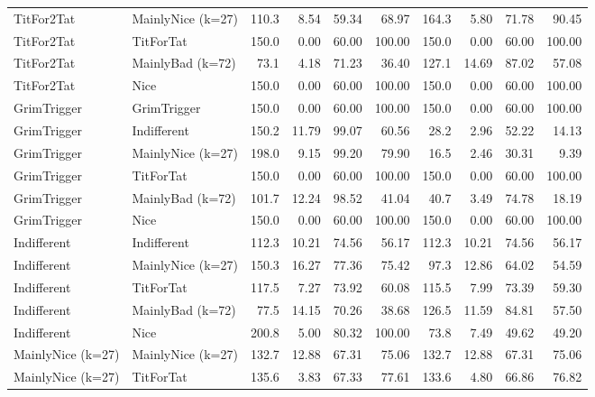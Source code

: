 \documentclass[journal,a4paper,10pt,twoside]{IEEEtran} %
\begin{document}
\begin{table}[ht]
\begin{tabular}{ll|rrrr|rrrr}
		TitFor2Tat        & MainlyNice (k=27) & 110.3 &  8.54 &  59.34 &      68.97 & 164.3 &  5.80 &  71.78 &      90.45 \\
		TitFor2Tat        & TitForTat         & 150.0 &  0.00 &  60.00 &     100.00 & 150.0 &  0.00 &  60.00 &     100.00 \\
		TitFor2Tat        & MainlyBad (k=72)  &  73.1 &  4.18 &  71.23 &      36.40 & 127.1 & 14.69 &  87.02 &      57.08 \\
		TitFor2Tat        & Nice              & 150.0 &  0.00 &  60.00 &     100.00 & 150.0 &  0.00 &  60.00 &     100.00 \\
		GrimTrigger       & GrimTrigger       & 150.0 &  0.00 &  60.00 &     100.00 & 150.0 &  0.00 &  60.00 &     100.00 \\
		GrimTrigger       & Indifferent       & 150.2 & 11.79 &  99.07 &      60.56 &  28.2 &  2.96 &  52.22 &      14.13 \\
		GrimTrigger       & MainlyNice (k=27) & 198.0 &  9.15 &  99.20 &      79.90 &  16.5 &  2.46 &  30.31 &       9.39 \\
		GrimTrigger       & TitForTat         & 150.0 &  0.00 &  60.00 &     100.00 & 150.0 &  0.00 &  60.00 &     100.00 \\
		GrimTrigger       & MainlyBad (k=72)  & 101.7 & 12.24 &  98.52 &      41.04 &  40.7 &  3.49 &  74.78 &      18.19 \\
		GrimTrigger       & Nice              & 150.0 &  0.00 &  60.00 &     100.00 & 150.0 &  0.00 &  60.00 &     100.00 \\
		Indifferent       & Indifferent       & 112.3 & 10.21 &  74.56 &      56.17 & 112.3 & 10.21 &  74.56 &      56.17 \\
		Indifferent       & MainlyNice (k=27) & 150.3 & 16.27 &  77.36 &      75.42 &  97.3 & 12.86 &  64.02 &      54.59 \\
		Indifferent       & TitForTat         & 117.5 &  7.27 &  73.92 &      60.08 & 115.5 &  7.99 &  73.39 &      59.30 \\
		Indifferent       & MainlyBad (k=72)  &  77.5 & 14.15 &  70.26 &      38.68 & 126.5 & 11.59 &  84.81 &      57.50 \\
		Indifferent       & Nice              & 200.8 &  5.00 &  80.32 &     100.00 &  73.8 &  7.49 &  49.62 &      49.20 \\
		MainlyNice (k=27) & MainlyNice (k=27) & 132.7 & 12.88 &  67.31 &      75.06 & 132.7 & 12.88 &  67.31 &      75.06 \\
		MainlyNice (k=27) & TitForTat         & 135.6 &  3.83 &  67.33 &      77.61 & 133.6 &  4.80 &  66.86 &      76.82 \\

\end{tabular}
\end{table}
\end{document}
